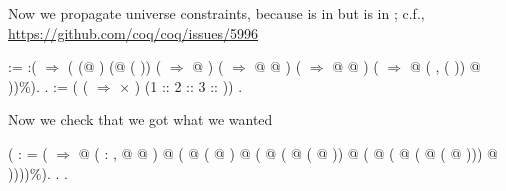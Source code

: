 Now we propagate universe constraints, because  is in
         but  is in ; c.f.,
        \url{https://github.com/coq/coq/issues/5996} \begin{coqdoccode}
\coqdocnoindent
\coqdoceol
\coqdocindent{2.00em}
 \coqdocvar{\_\_} :=    \coqdoceol
\coqdocindent{2.00em}
:( \coqdoceol
\coqdocindent{6.00em}
\ensuremath{\Rightarrow} ( (@  ) (@  ( ))\coqdoceol
\coqdocindent{9.50em}
\coqdoceol
\coqdocindent{9.50em}
(  \ensuremath{\Rightarrow}  @ )\coqdoceol
\coqdocindent{9.50em}
(   \ensuremath{\Rightarrow}  @  @ )\coqdoceol
\coqdocindent{9.50em}
\coqdoceol
\coqdocindent{9.50em}
(   \ensuremath{\Rightarrow}  @  @ )\coqdoceol
\coqdocindent{9.50em}
(   \ensuremath{\Rightarrow}  @ (\coqdocvar{\ensuremath{\lambda}} ,  ( )) @ ))\%).\coqdoceol
\coqdocemptyline
\coqdocindent{1.00em}
 .\coqdoceol
\coqdocindent{2.00em}
  :=  ( (  \ensuremath{\Rightarrow}  \ensuremath{\times} ) (1 :: 2 :: 3 :: )) \coqdoceol
\coqdocindent{2.00em}
   .\coqdoceol
\end{coqdoccode}
Now we check that we got what we wanted \begin{coqdoccode}
\coqdocemptyline
\coqdocindent{2.00em}
 (\coqdoceol
\coqdocindent{5.00em}
: \coqdoceol
\coqdocindent{6.00em}
= (  \ensuremath{\Rightarrow}\coqdoceol
\coqdocindent{8.50em}
\coqdoceol
\coqdocindent{9.50em}
@ (\coqdocvar{\ensuremath{\lambda}}  :  ,  @   @  )\coqdoceol
\coqdocindent{9.50em}
@ (\coqdoceol
\coqdocindent{12.00em}
@ ( @ )\coqdoceol
\coqdocindent{12.00em}
@ (\coqdoceol
\coqdocindent{14.50em}
@ ( @ ( @ ))\coqdoceol
\coqdocindent{14.50em}
@ (\coqdoceol
\coqdocindent{17.00em}
@ ( @ ( @ ( @ )))\coqdoceol
\coqdocindent{17.00em}
@ ))))\%).\coqdoceol
\coqdocindent{1.00em}
.\coqdoceol
\coqdocnoindent
{} .\coqdoceol
\end{coqdoccode}
